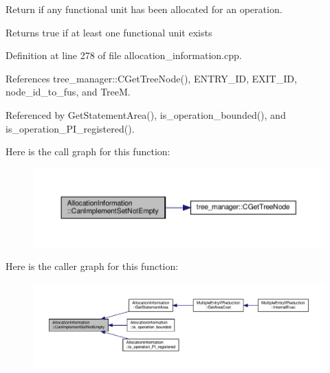 Return if any functional unit has been allocated for an operation. 

\begin{DoxyReturn}{Returns}
true if at least one functional unit exists 
\end{DoxyReturn}


Definition at line 278 of file allocation\+\_\+information.\+cpp.



References tree\+\_\+manager\+::\+C\+Get\+Tree\+Node(), E\+N\+T\+R\+Y\+\_\+\+ID, E\+X\+I\+T\+\_\+\+ID, node\+\_\+id\+\_\+to\+\_\+fus, and TreeM.



Referenced by Get\+Statement\+Area(), is\+\_\+operation\+\_\+bounded(), and is\+\_\+operation\+\_\+\+P\+I\+\_\+registered().

Here is the call graph for this function\+:
\nopagebreak
\begin{figure}[H]
\begin{center}
\leavevmode
\includegraphics[width=350pt]{d7/d79/classAllocationInformation_ab2d344c6b8ed05937f994c1bb04d66d4_cgraph}
\end{center}
\end{figure}
Here is the caller graph for this function\+:
\nopagebreak
\begin{figure}[H]
\begin{center}
\leavevmode
\includegraphics[width=350pt]{d7/d79/classAllocationInformation_ab2d344c6b8ed05937f994c1bb04d66d4_icgraph}
\end{center}
\end{figure}
\mbox{\label{classAllocationInformation_a6ee30c144c13ac6e4582b0568dcfe3ce}} 
